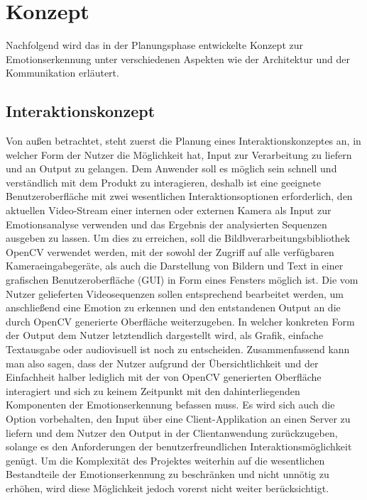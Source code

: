 \documentclass[12pt, a4paper]{report}
\begin{document}
\section{Konzept}
Nachfolgend wird das in der Planungsphase entwickelte Konzept zur Emotionserkennung unter verschiedenen Aspekten wie der Architektur und der Kommunikation erläutert.

\subsection{Interaktionskonzept}
Von außen betrachtet, steht zuerst die Planung eines Interaktionskonzeptes an, in welcher Form der Nutzer die Möglichkeit hat, Input zur Verarbeitung zu liefern und an Output zu gelangen. Dem Anwender soll es möglich sein schnell und verständlich mit dem Produkt zu interagieren, deshalb ist eine geeignete Benutzeroberfläche mit zwei wesentlichen Interaktionsoptionen erforderlich, den aktuellen Video-Stream einer internen oder externen Kamera als Input zur Emotionsanalyse verwenden und das Ergebnis der analysierten Sequenzen ausgeben zu lassen. Um dies zu erreichen, soll die Bildbverarbeitungsbibliothek OpenCV verwendet werden, mit der sowohl der Zugriff auf alle verfügbaren Kameraeingabegeräte, als auch die Darstellung von Bildern und Text in einer grafischen Benutzeroberfläche (GUI) in Form eines Fensters möglich ist. Die vom Nutzer gelieferten Videosequenzen sollen entsprechend bearbeitet werden, um anschließend eine Emotion zu erkennen und den entstandenen Output an die durch OpenCV generierte Oberfläche weiterzugeben. In welcher konkreten Form der Output dem Nutzer letztendlich dargestellt wird, als Grafik, einfache Textausgabe oder audiovisuell ist noch zu entscheiden.\newline
Zusammenfassend kann man also sagen, dass der Nutzer aufgrund der Übersichtlichkeit und der Einfachheit halber lediglich mit der von OpenCV generierten Oberfläche interagiert und sich zu keinem Zeitpunkt mit den dahinterliegenden Komponenten der Emotionserkennung befassen muss.\newline
Es wird sich auch die Option vorbehalten, den Input über eine Client-Applikation an einen Server zu liefern und dem Nutzer den Output in der Clientanwendung zurückzugeben, solange es den Anforderungen der benutzerfreundlichen Interaktionsmöglichkeit genügt. Um die Komplexität des Projektes weiterhin auf die wesentlichen Bestandteile der Emotionserkennung zu beschränken und nicht unnötig zu erhöhen, wird diese Möglichkeit jedoch vorerst nicht weiter berücksichtigt.
\end{document}
